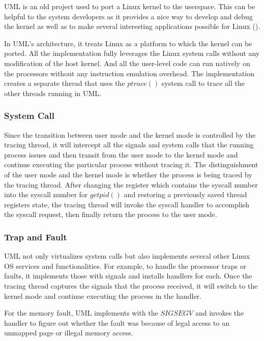 UML is an old project used to port a Linux kernel to the userspace. This can be helpful to the system developers as it provides a nice way to develop and debug the kernel as well as to make several interesting applications possible for Linux (\cite{JD06}). 

In UML's architecture, it treats Linux as a platform to which the kernel can be ported. All the implementation fully leverages the Linux system calls without any modification of the host kernel. And all the user-level code can run natively on the processors without any instruction emulation overhead. The implementation creates a separate thread that uses the $ptrace()$ system call to trace all the other threads running in UML. 

\subsubsection{System Call}

Since the transition between user mode and the kernel mode is controlled by the tracing thread, it will intercept all the signals and system calls that the running process issues and then transit from the user mode to the kernel mode and continue executing the particular process without tracing it. The distinguishment of the user mode and the kernel mode is whether the process is being traced by the tracing thread. After changing the register which contains the syscall number into the syscall number for $getpid()$ and restoring a previously saved thread registers state, the tracing thread will invoke the syscall handler to accomplish the syscall request, then finally return the process to the user mode. 

\subsubsection{Trap and Fault}

UML not only virtualizes system calls but also implements several other Linux OS services and functionalities. For example, to handle the processor traps or faults, it implements those with signals and installs handlers for each. Once the tracing thread captures the signals that the process received, it will switch to the kernel mode and continue executing the process in the handler.

For the memory fault, UML implements with the $SIGSEGV$ and invokes the handler to figure out whether the fault was because of legal access to an unmapped page or illegal memory access. 

